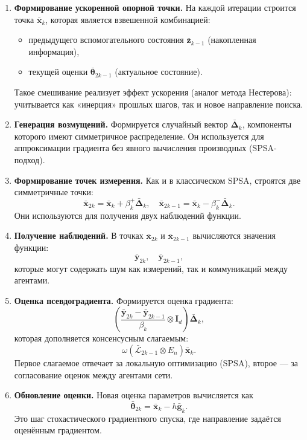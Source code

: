 \begin{enumerate}

\item \textbf{Формирование ускоренной опорной точки.}  
На каждой итерации строится точка $\bar{\mathbf{x}}_k$, которая является взвешенной комбинацией:
\begin{itemize}
    \item предыдущего вспомогательного состояния $\bar{\mathbf{z}}_{k-1}$ (накопленная информация),
    \item текущей оценки $\bar{\boldsymbol{\theta}}_{2k-1}$ (актуальное состояние).
\end{itemize}
Такое смешивание реализует эффект ускорения (аналог метода Нестерова): учитывается как «инерция» прошлых шагов, так и новое направление поиска.

\item \textbf{Генерация возмущений.}  
Формируется случайный вектор $\bar{\boldsymbol{\Delta}}_k$, компоненты которого имеют симметричное распределение.  
Он используется для аппроксимации градиента без явного вычисления производных (SPSA-подход).

\item \textbf{Формирование точек измерения.}  
Как и в классическом SPSA, строятся две симметричные точки:
\[
\bar{\mathbf{x}}_{2k} = \bar{\mathbf{x}}_k + \beta_k^+ \bar{\boldsymbol{\Delta}}_k,
\quad
\bar{\mathbf{x}}_{2k-1} = \bar{\mathbf{x}}_k - \beta_k^- \bar{\boldsymbol{\Delta}}_k.
\]
Они используются для получения двух наблюдений функции.

\item \textbf{Получение наблюдений.}  
В точках $\bar{\mathbf{x}}_{2k}$ и $\bar{\mathbf{x}}_{2k-1}$ вычисляются значения функции:
\[
\bar{\mathbf{y}}_{2k}, \quad \bar{\mathbf{y}}_{2k-1},
\]
которые могут содержать шум как измерений, так и коммуникаций между агентами.

\item \textbf{Оценка псевдоградиента.}  
Формируется оценка градиента:
\[
\left( \dfrac{\bar{\mathbf{y}}_{2k} - \bar{\mathbf{y}}_{2k-1}}{\beta_k} \otimes \mathbf{I}_d \right) \bar{\boldsymbol{\Delta}}_k,
\]
которая дополняется консенсусным слагаемым:
\[
\omega \left( \bar{\mathcal{L}}_{2k-1} \otimes E_n \right) \bar{\mathbf{x}}_k.
\]
Первое слагаемое отвечает за локальную оптимизацию (SPSA), второе — за согласование оценок между агентами сети.

\item \textbf{Обновление оценки.}  
Новая оценка параметров вычисляется как
\[
\bar{\boldsymbol{\theta}}_{2k} = \bar{\mathbf{x}}_k - h \bar{\mathbf{g}}_k.
\]
Это шаг стохастического градиентного спуска, где направление задаётся оценённым градиентом.


\end{enumerate}
